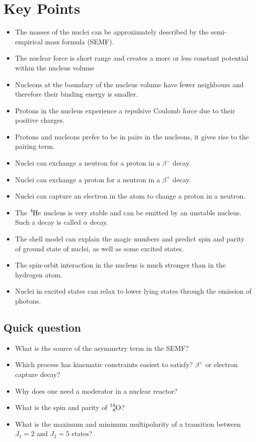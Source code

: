 \documentclass[12pt]{article}
\begin{document}
\section{Key Points}
\begin{itemize}
\item The masses of the nuclei can be approximately described by the semi-empirical mass formula (SEMF).
\item The nuclear force is short range and creates a more or less constant potential within the nucleus volume
\item Nucleons at the boundary of the nucleus volume have fewer neighbours and therefore their binding energy is smaller.
\item Protons in the nucleus experience a repulsive Coulomb force due to their positive charges.
\item Protons and nucleons prefer to be in pairs in the nucleons, it gives rise to the pairing term.
\item Nuclei can exchange a neutron for a proton in a $\beta^-$ decay. 
\item Nuclei can exchange a proton for a neutron in a $\beta^+$ decay. 
\item Nuclei can capture an electron in the atom to change a proton in a neutron. 
\item The $\ce{^4He}$ nucleus is very stable and can be emitted by an unstable nucleus. Such a decay is called $\alpha$ decay.
\item The shell model can explain the magic numbers and predict spin and parity of ground state of nuclei, as well as some excited states.
\item The spin-orbit interaction in the nucleus is much stronger than in the hydrogen atom. 
\item Nuclei in excited states can relax to lower lying states through the emission of photons.
\end{itemize}
\subsection{Quick question}
\begin{itemize}
\item What is the source of the asymmetry term in the SEMF?
\item Which process has kinematic constraints easiest to satisfy? $\beta^+$ or electron capture decay?
\item Why does one need a moderator in a nuclear reactor?
\item What is the spin and parity of $\ce{^{18}_{8}O}$?
\item What is the maximum and minimum multipolarity of a transition between $J_1=2$ and $J_2=5$ states? 
\end{itemize}
\pagebreak
\appendix
\end{document}
